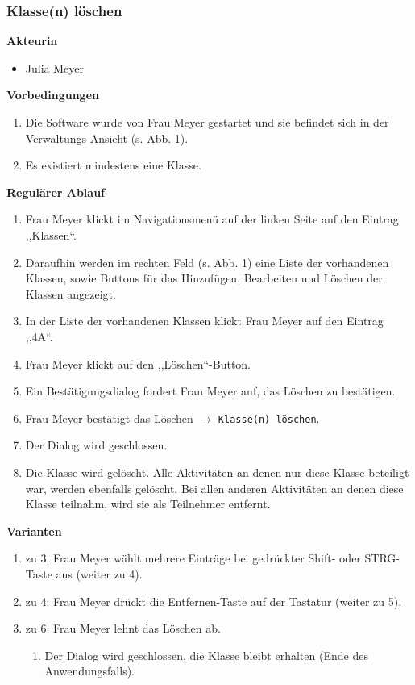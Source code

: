 \documentclass[fontsize=12pt,paper=a4,twoside]{scrartcl}
\begin{document}
\subsubsection{Klasse(n) löschen}
\label{subsubsec:KlasseLoeschen}

\textbf{Akteurin}
\begin{itemize}
\item Julia Meyer
\end{itemize}
\vspace{5pt}


\textbf{Vorbedingungen}
\begin{enumerate}
\item Die Software wurde von Frau Meyer gestartet und sie befindet sich in der Verwaltungs-Ansicht (s. Abb. 1).
\item Es existiert mindestens eine Klasse.
\end{enumerate}
\vspace{5pt}


\textbf{Regulärer Ablauf}
\begin{enumerate}
\item Frau Meyer klickt im Navigationsmenü auf der linken Seite auf den Eintrag ,,Klassen``.
\item Daraufhin werden im rechten Feld (s. Abb. 1) eine Liste der vorhandenen Klassen, sowie Buttons für das Hinzufügen, Bearbeiten und Löschen der Klassen angezeigt.
\item In der Liste der vorhandenen Klassen klickt Frau Meyer auf den Eintrag ,,4A``.
\item Frau Meyer klickt auf den ,,Löschen``-Button.
\item Ein Bestätigungsdialog fordert Frau Meyer auf, das Löschen zu bestätigen.
\item Frau Meyer bestätigt das Löschen $\rightarrow$ \texttt{Klasse(n) löschen}.
\item Der Dialog wird geschlossen.
\item Die Klasse wird gelöscht. Alle Aktivitäten an denen nur diese Klasse beteiligt war, werden ebenfalls gelöscht. Bei allen anderen Aktivitäten an denen diese Klasse teilnahm, wird sie als Teilnehmer entfernt.
\end{enumerate}
\vspace{5pt}


\textbf{Varianten}
\begin{enumerate}
\item zu 3: Frau Meyer wählt mehrere Einträge bei gedrückter Shift- oder STRG-Taste aus (weiter zu 4).
\item zu 4: Frau Meyer drückt die Entfernen-Taste auf der Tastatur (weiter zu 5).
\item zu 6: Frau Meyer lehnt das Löschen ab. 
	\begin{enumerate}[label=\arabic*.]
	\item Der Dialog wird geschlossen, die Klasse bleibt erhalten (Ende des Anwendungsfalls).
	\end{enumerate}
\end{enumerate}
\vspace{5pt}
\end{document}
